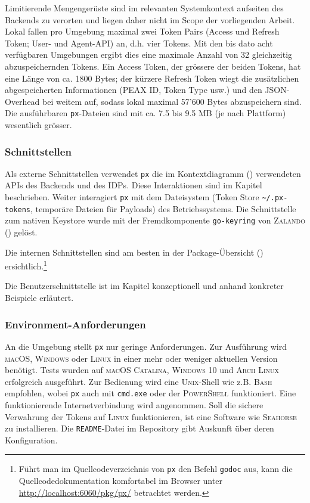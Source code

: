 Limitierende Mengengerüste sind im relevanten Systemkontext aufseiten des Backends zu verorten und liegen daher nicht im Scope der vorliegenden Arbeit. Lokal fallen pro Umgebung maximal zwei Token Pairs (Access und Refresh Token; User- und Agent-API) an, d.h. vier Tokens. Mit den bis dato acht verfügbaren Umgebungen ergibt dies eine maximale Anzahl von 32 gleichzeitig abzuspeichernden Tokens. Ein Access Token, der grössere der beiden Tokens, hat eine Länge von ca. 1800 Bytes; der kürzere Refresh Token wiegt die zusätzlichen abgespeicherten Informationen (PEAX ID, Token Type usw.) und den JSON-Overhead bei weitem auf, sodass lokal maximal 57'600 Bytes abzuspeichern sind. Die ausführbaren \texttt{px}-Dateien sind mit ca. 7.5 bis 9.5 MB (je nach Plattform) wesentlich grösser. 

\subsubsection{Schnittstellen}

Als externe Schnittstellen verwendet \texttt{px} die im Kontextdiagramm () verwendeten APIs des Backends und des IDPs. Diese Interaktionen sind im Kapitel  beschrieben. Weiter interagiert \texttt{px} mit dem Dateisystem (Token Store \texttt{\~{}/.px-tokens}, temporäre Dateien für Payloads) des Betriebssystems. Die Schnittstelle zum nativen Keystore wurde mit der Fremdkomponente \texttt{go-keyring} von \textsc{Zalando} () gelöst.

Die internen Schnittstellen sind am besten in der Package-Übersicht () ersichtlich.\footnote{Führt man im Quellcodeverzeichnis von \texttt{px} den Befehl \texttt{godoc} aus, kann die Quellcodedokumentation komfortabel im Browser unter \url{http://localhost:6060/pkg/px/} betrachtet werden.}

Die Benutzerschnittstelle ist im Kapitel  konzeptionell und anhand konkreter Beispiele erläutert. 

\subsubsection{Environment-Anforderungen}

An die Umgebung stellt \texttt{px} nur geringe Anforderungen. Zur Ausführung wird \textsc{macOS}, \textsc{Windows} oder \textsc{Linux} in einer mehr oder weniger aktuellen Version benötigt. Tests wurden auf \textsc{macOS Catalina}, \textsc{Windows 10} und \textsc{Arch Linux} erfolgreich ausgeführt. Zur Bedienung wird eine \textsc{Unix}-Shell wie z.B. \textsc{Bash} empfohlen, wobei \texttt{px} auch mit \texttt{cmd.exe} oder der \textsc{PowerShell} funktioniert. Eine funktionierende Internetverbindung wird angenommen. Soll die sichere Verwahrung der Tokens auf \textsc{Linux} funktionieren, ist eine Software wie \textsc{Seahorse} zu installieren. Die \texttt{README}-Datei im Repository gibt Auskunft über deren Konfiguration.

